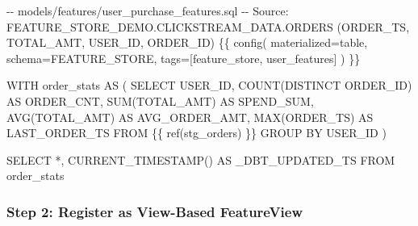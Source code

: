 \documentclass[
  letterpaper,
  DIV=11,
  numbers=noendperiod]{scrreprt}
\newenvironment{Shaded}{\begin{snugshade}}{\end{snugshade}}
\newcommand{\CommentTok}[1]{\textcolor[rgb]{0.37,0.37,0.37}{#1}}
\newcommand{\FunctionTok}[1]{\textcolor[rgb]{0.28,0.35,0.67}{#1}}
\newcommand{\KeywordTok}[1]{\textcolor[rgb]{0.00,0.23,0.31}{#1}}
\newcommand{\NormalTok}[1]{\textcolor[rgb]{0.00,0.23,0.31}{#1}}
\newcommand{\OperatorTok}[1]{\textcolor[rgb]{0.37,0.37,0.37}{#1}}
\newcommand{\StringTok}[1]{\textcolor[rgb]{0.13,0.47,0.30}{#1}}
\begin{document}
\begin{Shaded}
\begin{Highlighting}[]
\CommentTok{{-}{-} models/features/user\_purchase\_features.sql}
\CommentTok{{-}{-} Source: FEATURE\_STORE\_DEMO.CLICKSTREAM\_DATA.ORDERS (ORDER\_TS, TOTAL\_AMT, USER\_ID, ORDER\_ID)}
\NormalTok{\{\{ config(}
    \KeywordTok{materialized}\OperatorTok{=}\StringTok{\textquotesingle{}table\textquotesingle{}}\NormalTok{,}
    \KeywordTok{schema}\OperatorTok{=}\StringTok{\textquotesingle{}FEATURE\_STORE\textquotesingle{}}\NormalTok{,}
\NormalTok{    tags}\OperatorTok{=}\NormalTok{[}\StringTok{\textquotesingle{}feature\_store\textquotesingle{}}\NormalTok{, }\StringTok{\textquotesingle{}user\_features\textquotesingle{}}\NormalTok{]}
\NormalTok{) \}\}}

\KeywordTok{WITH}\NormalTok{ order\_stats }\KeywordTok{AS}\NormalTok{ (}
    \KeywordTok{SELECT} 
\NormalTok{        USER\_ID,}
        \FunctionTok{COUNT}\NormalTok{(}\KeywordTok{DISTINCT}\NormalTok{ ORDER\_ID) }\KeywordTok{AS}\NormalTok{ ORDER\_CNT,}
        \FunctionTok{SUM}\NormalTok{(TOTAL\_AMT) }\KeywordTok{AS}\NormalTok{ SPEND\_SUM,}
        \FunctionTok{AVG}\NormalTok{(TOTAL\_AMT) }\KeywordTok{AS}\NormalTok{ AVG\_ORDER\_AMT,}
        \FunctionTok{MAX}\NormalTok{(ORDER\_TS) }\KeywordTok{AS}\NormalTok{ LAST\_ORDER\_TS}
    \KeywordTok{FROM}\NormalTok{ \{\{ }\FunctionTok{ref}\NormalTok{(}\StringTok{\textquotesingle{}stg\_orders\textquotesingle{}}\NormalTok{) \}\}}
    \KeywordTok{GROUP} \KeywordTok{BY}\NormalTok{ USER\_ID}
\NormalTok{)}

\KeywordTok{SELECT} \OperatorTok{*}\NormalTok{,}
    \FunctionTok{CURRENT\_TIMESTAMP}\NormalTok{() }\KeywordTok{AS}\NormalTok{ \_DBT\_UPDATED\_TS}
\KeywordTok{FROM}\NormalTok{ order\_stats}
\end{Highlighting}
\end{Shaded}

\hypertarget{step-2-register-as-view-based-featureview}{%
\subsubsection{Step 2: Register as View-Based
FeatureView}\label{step-2-register-as-view-based-featureview}}
\end{document}
